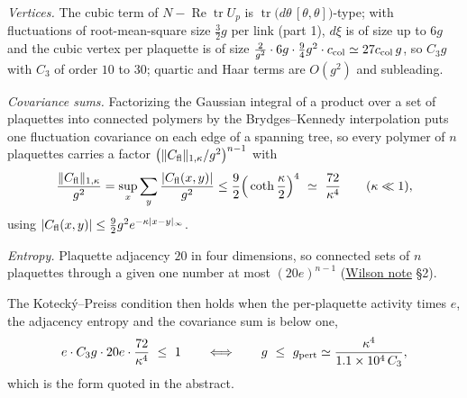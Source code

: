 \documentclass[11pt,a4paper]{article}
\begin{document}
\emph{Vertices.} The cubic term of
\(N-\operatorname{Re}\operatorname{tr}U_p\) is
\(\operatorname{tr}\big(d\theta\,[\theta,\theta]\big)\)-type; with
fluctuations of root-mean-square size \(\tfrac32g\) per link (part 1),
\(d\xi\) is of size up to \(6g\) and the cubic vertex per plaquette is
of size
\(\tfrac2{g^2}\cdot6g\cdot\tfrac94g^2\cdot c_{\rm col}\simeq27c_{\rm col}\,g\),
so \(C_3g\) with \(C_3\) of order \(10\) to \(30\); quartic and Haar
terms are \(O(g^2)\) and subleading.

\emph{Covariance sums.} Factorizing the Gaussian integral of a product
over a set of plaquettes into connected polymers by the Brydges--Kennedy
interpolation puts one fluctuation covariance on each edge of a spanning
tree, so every polymer of \(n\) plaquettes carries a factor
\(\big(\|C_{\rm fl}\|_{1,\kappa}/g^2\big)^{n-1}\) with
\[\frac{\|C_{\rm fl}\|_{1,\kappa}}{g^2}=\sup_x\sum_y\frac{|C_{\rm fl}(x,y)|}{g^2}
\le\frac92\Big(\coth\frac\kappa2\Big)^4\ \simeq\ \frac{72}{\kappa^4}\qquad(\kappa\ll1),\]
using \(|C_{\rm fl}(x,y)|\le\tfrac92g^2e^{-\kappa|x-y|_\infty}\).

\emph{Entropy.} Plaquette adjacency \(20\) in four dimensions, so
connected sets of \(n\) plaquettes through a given one number at most
\((20e)^{n-1}\) (\href{wilson-strong-coupling-explicit.md}{Wilson note}
§2).

The Kotecký--Preiss condition then holds when the per-plaquette activity
times \(e\), the adjacency entropy and the covariance sum is below one,
\[e\cdot C_3g\cdot20e\cdot\frac{72}{\kappa^4}\ \le\ 1
\qquad\Longleftrightarrow\qquad
g\ \le\ g_{\rm pert}\simeq\frac{\kappa^4}{1.1\times10^4\,C_3},\] which
is the form quoted in the abstract.
\end{document}

